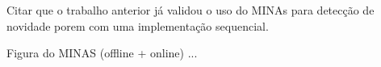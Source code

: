 


Citar que o trabalho anterior já validou o uso do MINAs para detecção de novidade porem com uma implementação sequencial. 


Figura do MINAS (offline + online) ...

